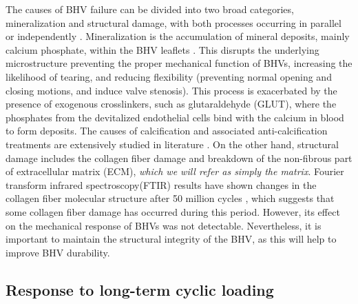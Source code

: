 	The causes of BHV failure can be divided into two broad categories, mineralization and structural damage, with both processes occurring in parallel or independently \cite{sacks_collagen_2002}. Mineralization is the accumulation of mineral deposits, mainly calcium phosphate, within the BHV leaflets \cite{schoen_calcification_2005}. This disrupts the underlying microstructure preventing the proper mechanical function of BHVs, increasing the likelihood of tearing, and reducing flexibility (preventing normal opening and closing motions, and induce valve stenosis). This process is exacerbated by the presence of exogenous crosslinkers, such as glutaraldehyde (GLUT), where the phosphates from the devitalized endothelial cells bind with the calcium in blood to form deposits. The causes of calcification and associated anti-calcification treatments are extensively studied in literature \cite{park_novel_1997, isenburg_tannic_2005, vyavahare_prevention_1997}. On the other hand, structural damage includes the collagen fiber damage and breakdown of the non-fibrous part of extracellular matrix (ECM), \emph{which we will refer as simply the matrix}. Fourier transform infrared spectroscopy(FTIR) results have shown changes in the collagen fiber molecular structure after 50 million cycles \cite{sun_response_2004}, which suggests that some collagen fiber damage has occurred during this period. However, its effect on the mechanical response of BHVs was not detectable. Nevertheless, it is important to maintain the structural integrity of the BHV, as this will help to improve BHV durability. 
	
	
\subsection{Response to long-term cyclic loading}


